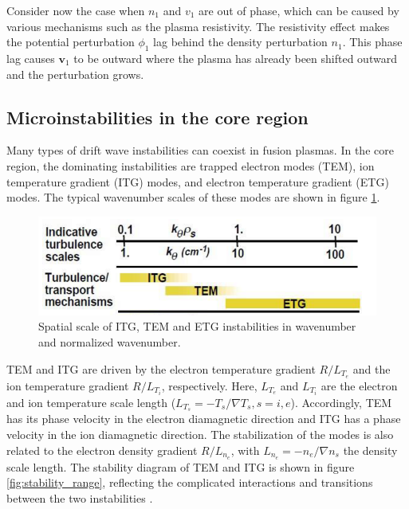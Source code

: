 Consider now the case when $n_1$ and $v_1$ are out of phase, which can be caused by various mechanisms such as the plasma resistivity. The resistivity effect makes the potential perturbation $\phi_1$ lag behind the density perturbation $n_1$. This phase lag causes $\boldsymbol{v}_1$ to be outward where the plasma has already been shifted outward and the perturbation grows.


\subsection{Microinstabilities in the core region}

Many types of drift wave instabilities can coexist in fusion plasmas. In the core region, the dominating instabilities are trapped electron modes (TEM), ion temperature gradient (ITG) modes, and electron temperature gradient (ETG) modes. The typical wavenumber scales of these modes are shown in figure \ref{fig:turb_scale}.

\begin{figure}[h]
\begin{centering}
\includegraphics[scale=0.55]{turb_scale.png}
\par\end{centering}
\caption{Spatial scale of ITG, TEM and ETG instabilities in wavenumber and normalized wavenumber.}
\label{fig:turb_scale}
\end{figure}


TEM and ITG are driven by the electron temperature gradient $R/L_{T_e}$ and the ion temperature gradient $R/L_{T_i}$, respectively. Here, $L_{T_e}$ and $L_{T_i}$ are the electron and ion temperature scale length ($L_{T_s}=-T_s/\nabla T_s, s=i,e$). Accordingly, TEM has its phase velocity in the electron diamagnetic direction and ITG has a phase velocity in the ion diamagnetic direction. The stabilization of the modes is also related to the electron density gradient $R/L_{n_e}$, with $L_{n_e}=-n_e/\nabla n_s$ the density scale length. The stability diagram of TEM and ITG is shown in figure \ref{fig:stability_range}, reflecting the complicated interactions and transitions between the two instabilities \cite{Garbet_NF_10_gyrokinetic}.


